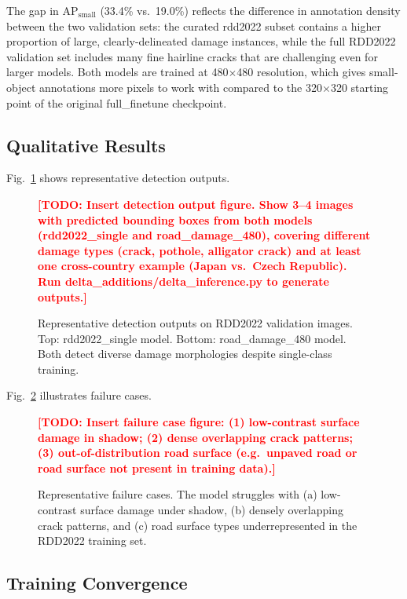 \documentclass[conference]{IEEEtran}
\newcommand{\TODO}[1]{\textcolor{red}{\textbf{[TODO: #1]}}}
\begin{document}
The gap in AP$_\text{small}$ (33.4\% vs.\ 19.0\%) reflects the difference in
annotation density between the two validation sets: the curated rdd2022
subset contains a higher proportion of large, clearly-delineated damage instances,
while the full RDD2022 validation set includes many fine hairline cracks that are
challenging even for larger models.
Both models are trained at 480$\times$480 resolution, which gives small-object
annotations more pixels to work with compared to the 320$\times$320 starting
point of the original full\_finetune checkpoint.

\subsection{Qualitative Results}

Fig.~\ref{fig:detections} shows representative detection outputs.

\begin{figure}[t]
  \centering
  \TODO{Insert detection output figure. Show 3--4 images with predicted bounding
        boxes from both models (rdd2022\_single and road\_damage\_480), covering
        different damage types (crack, pothole, alligator crack) and at least one
        cross-country example (Japan vs.\ Czech Republic). Run
        delta\_additions/delta\_inference.py to generate outputs.}
  \caption{Representative detection outputs on RDD2022 validation images.
           Top: rdd2022\_single model. Bottom: road\_damage\_480 model.
           Both detect diverse damage morphologies despite single-class training.}
  \label{fig:detections}
\end{figure}

Fig.~\ref{fig:failures} illustrates failure cases.

\begin{figure}[t]
  \centering
  \TODO{Insert failure case figure: (1) low-contrast surface damage in shadow;
        (2) dense overlapping crack patterns; (3) out-of-distribution road surface
        (e.g.\ unpaved road or road surface not present in training data).}
  \caption{Representative failure cases. The model struggles with (a) low-contrast
           surface damage under shadow, (b) densely overlapping crack patterns, and
           (c) road surface types underrepresented in the RDD2022 training set.}
  \label{fig:failures}
\end{figure}

\subsection{Training Convergence}
\end{document}
